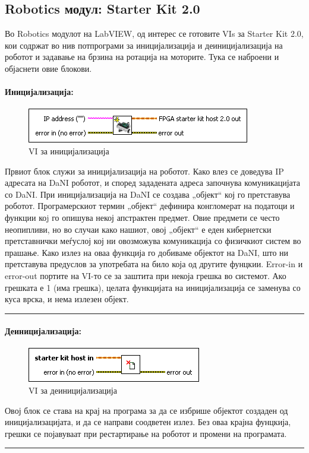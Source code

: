 \documentclass[12pt]{article}
\begin{document}
  \subsection{Robotics модул: Starter Kit 2.0}
    Во Robotics модулот на LabVIEW, од интерес се готовите VIs за Starter Kit 2.0, кои содржат во нив потпрограми за иницијализација и деиницијализација на роботот и задавање на брзина на ротација на моторите. Тука се наброени и објаснети овие блокови.

		\paragraph{Иницијализација:\\}
			\begin{figure}[h]
				\includegraphics[width=0.55\linewidth]{./images/init.png}
				\raggedright
				\caption{VI за иницијализација}
				\label{fig:init.png}
				\end{figure}
		  Првиот блок служи за иницијализација на роботот. Како влез се доведува IP адресата на DaNI роботот, и според зададената адреса започнува комуникацијата со DaNI. При иницијализација на DaNI се создава „објект“ кој го претставува роботот. Програмерскиот термин „објект“ дефинира конгломерат на податоци и функции коj го опишува некој апстрактен предмет. Овие предмети се често неопипливи, но во случаи како нашиот, овој „објект“ е еден кибернетски претставнички меѓуслој кој ни овозможува комуникација со физичкиот систем во прашање. Како излез на оваа функција го добиваме објектот на DaNI, што ни претставува предуслов за употребата на било која од другите фунцкии. Error-in и error-out портите на VI-то се за заштита при некоја грешка во системот. Ако грешката е 1 (има грешка), целата функцијата на иницијализација се заменува со куса врска, и нема излезен објект.
      \textcolor[RGB]{150,150,150}{\rule{\linewidth}{1.6pt}}

    \paragraph{Деиницијализација:\\}
    	\begin{figure}[h]
        \includegraphics[width = 0.55\linewidth]{./images/deinit.png}
				\raggedright
				\caption{VI за деиницијализација}
				\label{fig:deinit.png}
				\end{figure}
      Овој блок се става на крај на програма за да се избрише објектот создаден од иницијализацијата, и да се направи соодветен излез. Без оваа крајна фунцкија, грешки се појавуваат при рестартирање на роботот и промени на програмата.
      \textcolor[RGB]{150,150,150}{\rule{\linewidth}{1.6pt}}
\end{document}
